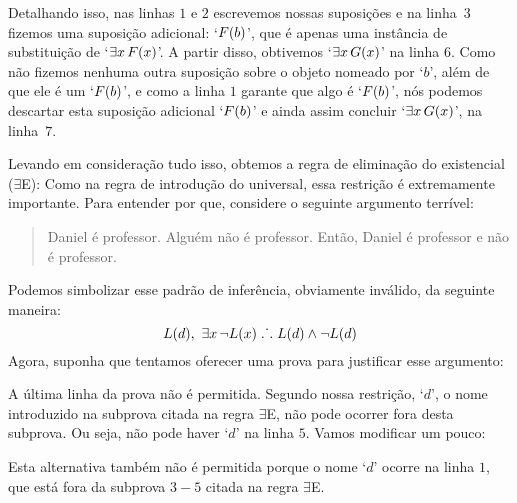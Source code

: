 Detalhando isso, nas linhas $1$ e $2$ escrevemos nossas suposições e na linha~$3$ fizemos uma suposição adicional: `$\mathord{F}(b)$', que é apenas uma instância de substituição de `$\exists x\,\mathord{F}(x)$'. A partir disso, obtivemos `$\exists x\,\mathord{G}(x)$' na linha $6$. Como não fizemos nenhuma outra suposição sobre o objeto nomeado por `$b$', além de que ele é um `$\mathord{F}(b)$', e como a linha $1$ garante que algo é `$\mathord{F}(b)$', nós podemos descartar esta suposição adicional `$\mathord{F}(b)$' e ainda assim concluir `$\exists x\,\mathord{G}(x)$', na linha~$7$.

Levando em consideração tudo isso, obtemos a regra de eliminação  do existencial ($\exists$E):
 Como na regra de introdução do universal, essa restrição é extremamente importante. Para entender por que, considere o seguinte argumento terrível:
	\begin{quote}
		Daniel é professor. Alguém não é professor. Então, Daniel é professor e não é professor.
	\end{quote}
Podemos simbolizar esse padrão de inferência, obviamente inválido, da seguinte maneira:
$$\mathord{L}(d),\,\, \exists x\, \neg\mathord{L}(x) \mathrel{\ldotp\dot{}\,\ldotp} \mathord{L}(d) \wedge \neg \mathord{L}(d)$$
Agora, suponha que tentamos oferecer uma prova para justificar esse argumento:

\begin{fitchproof}
	\open	
	\close
\end{fitchproof}
A última linha da prova não é permitida. Segundo nossa restrição, `$d$', o nome introduzido na subprova citada na regra $\exists$E, não pode ocorrer fora desta subprova. Ou seja, não pode haver `$d$' na linha $5$. Vamos modificar um pouco:
\begin{fitchproof}
	\open	
	\close
\end{fitchproof}
Esta alternativa também não é permitida porque o nome `$d$' ocorre na linha $1$, que está fora da subprova $3-5$ citada na regra $\exists$E.

